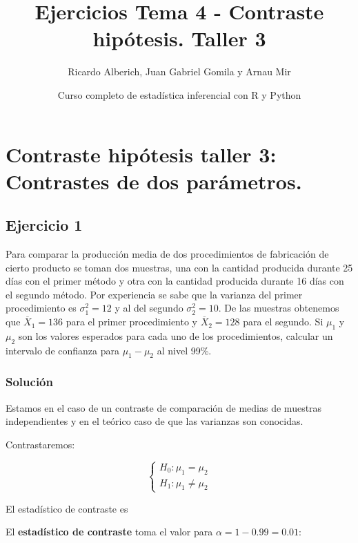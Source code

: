 \documentclass[
]{article}
\title{Ejercicios Tema 4 - Contraste hipótesis. Taller 3}
\author{Ricardo Alberich, Juan Gabriel Gomila y Arnau Mir}
\date{Curso completo de estadística inferencial con R y Python}
\begin{document}
\maketitle

{
\hypersetup{linkcolor=blue}
\setcounter{tocdepth}{4}
\tableofcontents
}
\hypertarget{contraste-hipuxf3tesis-taller-3-contrastes-de-dos-paruxe1metros.}{%
\section{Contraste hipótesis taller 3: Contrastes de dos
parámetros.}\label{contraste-hipuxf3tesis-taller-3-contrastes-de-dos-paruxe1metros.}}

\hypertarget{ejercicio-1}{%
\subsection{Ejercicio 1}\label{ejercicio-1}}

Para comparar la producción media de dos procedimientos de fabricación
de cierto producto se toman dos muestras, una con la cantidad producida
durante 25 días con el primer método y otra con la cantidad producida
durante 16 días con el segundo método. Por experiencia se sabe que la
varianza del primer procedimiento es \(\sigma_{1}^2=12\) y al del
segundo \(\sigma_{2}^2=10\). De las muestras obtenemos que
\(\overline{X}_{1}=136\) para el primer procedimiento y
\(\overline{X}_{2}=128\) para el segundo. Si \(\mu_{1}\) y \(\mu_{2}\)
son los valores esperados para cada uno de los procedimientos, calcular
un intervalo de confianza para \(\mu_{1}-\mu_{2}\) al nivel 99\%.

\hypertarget{soluciuxf3n}{%
\subsubsection{Solución}\label{soluciuxf3n}}

Estamos en el caso de un contraste de comparación de medias de muestras
independientes y en el teórico caso de que las varianzas son conocidas.

Contrastaremos:

\[
\left\{
\begin{array}{ll}
H_{0}:\mu_1=\mu_2\\
H_{1}:\mu_1\not= \mu_2 
\end{array}
\right.
\]

El estadístico de contraste es

El \textbf{estadístico de contraste} toma el valor para
\(\alpha=1-0.99=0.01\):
\end{document}
